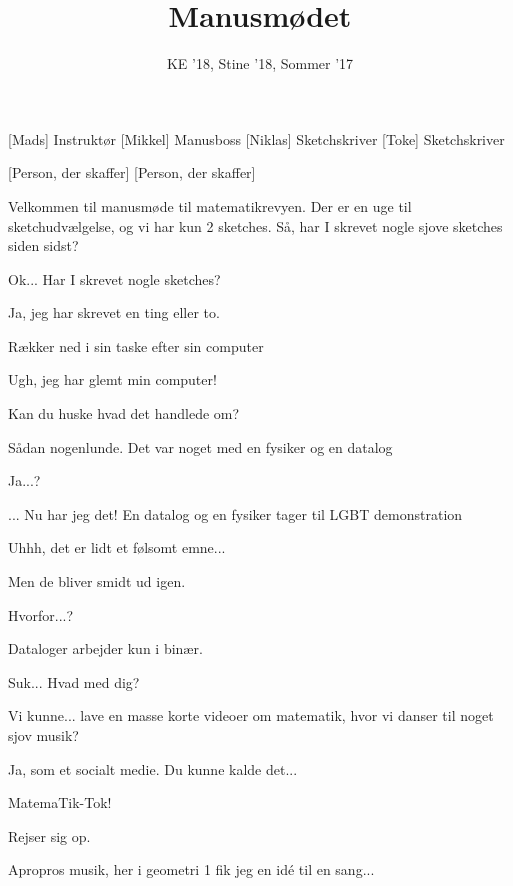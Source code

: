 \documentclass[a4paper,11pt]{article}
\title{Manusmødet}
\author{KE '18, Stine '18, Sommer '17}
\begin{document}
\maketitle

\begin{roles}
[Mads] Instruktør
[Mikkel] Manusboss
[Niklas] Sketchskriver
[Toke] Sketchskriver
\end{roles}

\begin{props}
[Person, der skaffer]
[Person, der skaffer]
\end{props}


\begin{sketch}

 Velkommen til manusmøde til matematikrevyen. Der er en uge til sketchudvælgelse, og vi har kun 2 sketches. Så, har I skrevet nogle sjove sketches siden sidst?


 Ok... Har I skrevet nogle sketches?

 Ja, jeg har skrevet en ting eller to.

 Rækker ned i sin taske efter sin computer

 Ugh, jeg har glemt min computer!

 Kan du huske hvad det handlede om?

 Sådan nogenlunde. Det var noget med en fysiker og en datalog

 Ja...?

 ... Nu har jeg det! En datalog og en fysiker tager til LGBT demonstration

 Uhhh, det er lidt et følsomt emne...

 Men de bliver smidt ud igen.

 Hvorfor...?

 Dataloger arbejder kun i binær.

 Suk... Hvad med dig?

 Vi kunne... lave en masse korte videoer om matematik, hvor vi danser til noget sjov musik?

 Ja, som et socialt medie. Du kunne kalde det...

 MatemaTik-Tok!

 Rejser sig op.

 Apropros musik, her i geometri 1 fik jeg en idé til en sang...


\end{sketch}
\end{document}
